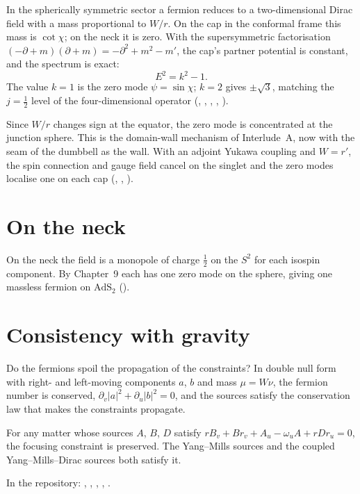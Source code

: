 In the spherically symmetric sector a fermion reduces to a two-dimensional Dirac field with a mass proportional to $W/r$. On the cap in the conformal frame this mass is $\cot\chi$; on the neck it is zero. With the supersymmetric factorisation $(-\partial+m)(\partial+m)=-\partial^2+m^2-m'$, the cap's partner potential is constant, and the spectrum is exact:
\[
E^2=k^2-1 .
\]
The value $k=1$ is the zero mode $\psi=\sin\chi$; $k=2$ gives $\pm\sqrt3$, matching the $j=\tfrac12$ level of the four-dimensional operator (, , , , ).

Since $W/r$ changes sign at the equator, the zero mode is concentrated at the junction sphere. This is the domain-wall mechanism of Interlude~A, now with the seam of the dumbbell as the wall. With an adjoint Yukawa coupling and $W=r'$, the spin connection and gauge field cancel on the singlet and the zero modes localise one on each cap (, , ).

\section{On the neck}

On the neck the field is a monopole of charge $\tfrac12$ on the $S^2$ for each isospin component. By Chapter~9 each has one zero mode on the sphere, giving one massless fermion on $\mathrm{AdS}_2$ ().

\section{Consistency with gravity}

Do the fermions spoil the propagation of the constraints? In double null form with right- and left-moving components $a$, $b$ and mass $\mu=W\nu$, the fermion number is conserved, $\partial_v|a|^2+\partial_u|b|^2=0$, and the sources satisfy the conservation law that makes the constraints propagate.

\begin{theorem}\proved
For any matter whose sources $A$, $B$, $D$ satisfy $rB_v+Br_v+A_u-\omega_uA+rDr_u=0$, the focusing constraint is preserved. The Yang--Mills sources and the coupled Yang--Mills--Dirac sources both satisfy it.
\end{theorem}
\noindent In the repository: , , , , .

